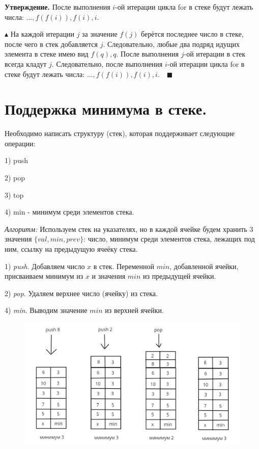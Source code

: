 \textbf{Утверждение.} После выполнения $i$-ой итерации цикла for в стеке будут лежать числа:
$...,f(f(i)), f(i), i$.

$\blacktriangle$ На каждой итерации $j$ за значение $f(j)$ берётся последнее число в стеке, после чего в стек добавляется $j$. Следовательно, любые два подряд идущих элемента в стеке имею вид $f(q), q$. После выполнения $j$-ой итерации в стек всегда кладут $j$. Следовательно, после выполнения $i$-ой итерации цикла for в стеке будут лежать числа:
$...,f(f(i)), f(i), i. \quad \blacksquare$

\setcounter{section}{5}
\section{Поддержка минимума в стеке.}

Необходимо написать структуру (стек), которая поддерживает следующие операции:

1) push

2) pop

3) top

4) min - минимум среди элементов стека.  

\textit{Алгоритм:}
Используем стек на указателях, но в каждой ячейке будем хранить 3 значения $\{val, min, prev\}$: число, минимум среди элементов стека, лежащих под ним, ссылку на предыдущую ячеёку стека. 

1) \textit{push}. Добавляем число $x$ в стек. Переменной $min$, добавленной ячейки, присваиваем минимум из $x$ и значения $min$ из предыдущей ячейки.

2) \textit{pop}. Удаляем верхнее число (ячейку) из стека.

4) \textit{min}. Выводим значение $min$ из верхней ячейки.

\begin{figure}[h]
\begin{center}
\includegraphics[width=0.9\linewidth]{images/2-5_stack_min}
\label{fig:mpr}
\end{center}
\end{figure}